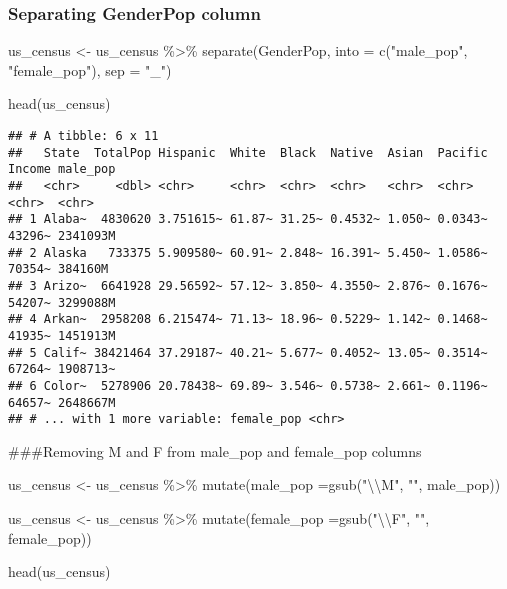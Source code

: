 \documentclass[
]{article}
\newenvironment{Shaded}{\begin{snugshade}}{\end{snugshade}}
\newcommand{\AttributeTok}[1]{\textcolor[rgb]{0.77,0.63,0.00}{#1}}
\newcommand{\FunctionTok}[1]{\textcolor[rgb]{0.00,0.00,0.00}{#1}}
\newcommand{\NormalTok}[1]{#1}
\newcommand{\OtherTok}[1]{\textcolor[rgb]{0.56,0.35,0.01}{#1}}
\newcommand{\SpecialCharTok}[1]{\textcolor[rgb]{0.00,0.00,0.00}{#1}}
\newcommand{\StringTok}[1]{\textcolor[rgb]{0.31,0.60,0.02}{#1}}
\begin{document}
\hypertarget{separating-genderpop-column}{%
\subsubsection{Separating GenderPop
column}\label{separating-genderpop-column}}

\begin{Shaded}
\begin{Highlighting}[]
\NormalTok{us\_census }\OtherTok{\textless{}{-}}\NormalTok{ us\_census }\SpecialCharTok{\%\textgreater{}\%} 
  \FunctionTok{separate}\NormalTok{(GenderPop, }\AttributeTok{into =} \FunctionTok{c}\NormalTok{(}\StringTok{"male\_pop"}\NormalTok{, }\StringTok{"female\_pop"}\NormalTok{), }\AttributeTok{sep =} \StringTok{"\_"}\NormalTok{)}

\FunctionTok{head}\NormalTok{(us\_census)}
\end{Highlighting}
\end{Shaded}

\begin{verbatim}
## # A tibble: 6 x 11
##   State  TotalPop Hispanic  White  Black  Native  Asian  Pacific Income male_pop
##   <chr>     <dbl> <chr>     <chr>  <chr>  <chr>   <chr>  <chr>   <chr>  <chr>   
## 1 Alaba~  4830620 3.751615~ 61.87~ 31.25~ 0.4532~ 1.050~ 0.0343~ 43296~ 2341093M
## 2 Alaska   733375 5.909580~ 60.91~ 2.848~ 16.391~ 5.450~ 1.0586~ 70354~ 384160M 
## 3 Arizo~  6641928 29.56592~ 57.12~ 3.850~ 4.3550~ 2.876~ 0.1676~ 54207~ 3299088M
## 4 Arkan~  2958208 6.215474~ 71.13~ 18.96~ 0.5229~ 1.142~ 0.1468~ 41935~ 1451913M
## 5 Calif~ 38421464 37.29187~ 40.21~ 5.677~ 0.4052~ 13.05~ 0.3514~ 67264~ 1908713~
## 6 Color~  5278906 20.78438~ 69.89~ 3.546~ 0.5738~ 2.661~ 0.1196~ 64657~ 2648667M
## # ... with 1 more variable: female_pop <chr>
\end{verbatim}

\#\#\#Removing M and F from male\_pop and female\_pop columns

\begin{Shaded}
\begin{Highlighting}[]
\NormalTok{us\_census }\OtherTok{\textless{}{-}}\NormalTok{ us\_census }\SpecialCharTok{\%\textgreater{}\%} 
  \FunctionTok{mutate}\NormalTok{(}\AttributeTok{male\_pop =}\FunctionTok{gsub}\NormalTok{(}\StringTok{"}\SpecialCharTok{\textbackslash{}\textbackslash{}}\StringTok{M"}\NormalTok{, }\StringTok{""}\NormalTok{, male\_pop))}

\NormalTok{us\_census }\OtherTok{\textless{}{-}}\NormalTok{ us\_census }\SpecialCharTok{\%\textgreater{}\%} 
  \FunctionTok{mutate}\NormalTok{(}\AttributeTok{female\_pop =}\FunctionTok{gsub}\NormalTok{(}\StringTok{"}\SpecialCharTok{\textbackslash{}\textbackslash{}}\StringTok{F"}\NormalTok{, }\StringTok{""}\NormalTok{, female\_pop))}

\FunctionTok{head}\NormalTok{(us\_census)}
\end{Highlighting}
\end{Shaded}
\end{document}
